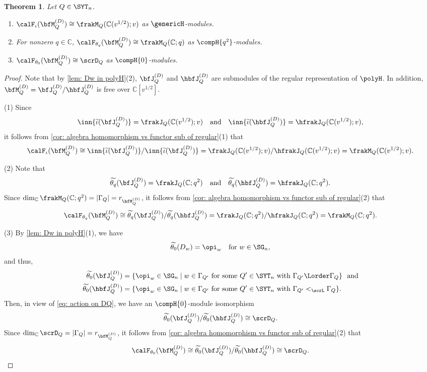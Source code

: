 \documentclass[12pt, reqno]{amsart}
\theoremstyle{plain}
\newtheorem{theorem}{Theorem}[section]
\theoremstyle{definition}
\numberwithin{equation}{section}
\numberwithin{figure}{section}
\numberwithin{table}{section}
\def\C{\mathbb C}
\begin{document}
\begin{theorem}\label{thm: obtain CGammaQ}
Let  $Q \in \SYT_n$.
\begin{enumerate}[label = {\rm (\arabic*)}]
\item $\calF_{\iota}(\bfM^{(D)}_Q) \cong \frakM_Q(\C(v^{1/2}); v)$ as $\genericH$-modules. 
\item For nonzero $q \in \C$, $\calF_{\theta_q}(\bfM^{(D)}_Q) \cong \frakM_Q(\C;q)$ as $\compH{q^2}$-modules.
\item 
$\calF_{\theta_0}(\bfM^{(D)}_Q) \cong \scrD_Q$ as $\compH{0}$-modules.
\end{enumerate} 
\end{theorem}
\begin{proof}
Note that by \cref{lem: Dw in polyH}(2), $\bfJ^{(D)}_Q$ and  $\hbfJ^{(D)}_Q$ are submodules of the regular representation of $\polyH$.
In addition, $\bfM^{(D)}_Q = \bfJ^{(D)}_Q / \hbfJ^{(D)}_Q$ is free over $\C[v^{1/2}]$.

(1) Since 
\[
\inn{\widetilde{\iota}(\bfJ^{(D)}_Q)} = \frakJ_Q(\C(v^{1/2});v) \quad\text{and}\quad
\inn{\widetilde{\iota}(\hbfJ^{(D)}_Q)} = \hfrakJ_Q(\C(v^{1/2});v),
\]
it follows from  \cref{cor: algebra homomorphism vs functor sub of regular}(1) that  
\[
\calF_\iota(\bfM^{(D)}_Q) \cong \inn{\widetilde{\iota}(\bfJ^{(D)}_Q)}/\inn{\widetilde{\iota}(\bfJ^{(D)}_Q)} = \frakJ_Q(\C(v^{1/2});v)/\hfrakJ_Q(\C(v^{1/2});v) = \frakM_Q(\C(v^{1/2});v).
\]

(2) Note that 
\[
\widetilde{\theta_q}(\bfJ^{(D)}_Q) = \frakJ_Q(\C;q^2) \quad\text{and}\quad
\widetilde{\theta_q}(\hbfJ^{(D)}_Q) = \hfrakJ_Q(\C;q^2).
\]
Since $\dim_{\C} \frakM_Q(\C;q^2) = |\Gamma_Q| = r_{\bfM^{(D)}_Q}$, 
it follows from  \cref{cor: algebra homomorphism vs functor sub of regular}(2) that  
\[
\calF_{\theta_q}(\bfM^{(D)}_Q) \cong \widetilde{\theta_q}(\bfJ^{(D)}_Q)/\widetilde{\theta_q}(\hbfJ^{(D)}_Q) = \frakJ_Q(\C;q^2)/\hfrakJ_Q(\C;q^2) = \frakM_Q(\C;q^2).
\]

(3) By \cref{lem: Dw in polyH}(1), we have
\begin{align*}
\widetilde{\theta_0}(D_w) = \opi_w \quad \text{for $w \in \SG_n$}, 
\end{align*}
and thus, 
\begin{align*}
\widetilde{\theta_0}(\bfJ^{(D)}_Q)
& = 
\{\opi_w \in \SG_n \mid  \text{$w \in \Gamma_{Q'}$ for some $Q' \in \SYT_n$ with $\Gamma_{Q'} \Lorder \Gamma_Q$} \} \ \ \text{and}
\\
\widetilde{\theta_0}(\hbfJ^{(D)}_Q)
& =
\{\opi_w \in \SG_n \mid  \text{$w \in \Gamma_{Q'}$ for some $Q' \in \SYT_n$ with $\Gamma_{Q'} <_{\scrL} \Gamma_Q$} \}.
\end{align*}
Then, in view of \cref{eq: action on DQ}, we have an $\compH{0}$-module isomorphism 
\[
\widetilde{\theta_0}(\bfJ^{(D)}_Q)/
\widetilde{\theta_0}(\hbfJ^{(D)}_Q) \cong \scrD_Q.
\]
Since $\dim_{\C} \scrD_Q = |\Gamma_Q| = r_{\bfM^{(D)}_Q}$, it follows from  \cref{cor: algebra homomorphism vs functor sub of regular}(2) that   
\[
\calF_{\theta_0}(\bfM^{(D)}_Q) \cong \widetilde{\theta_0}(\bfJ^{(D)}_Q)/ \widetilde{\theta_0}(\hbfJ^{(D)}_Q) \cong \scrD_Q.
\qedhere
\]
\end{proof}
\end{document}
